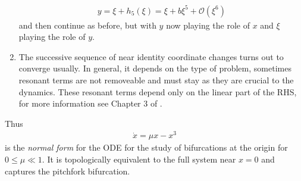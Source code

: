 \begin{ex}
\begin{enumerate}
	\begin{align}
		y = \xi + h_5(\xi) = \xi + b \xi^5 + \mathcal{O}(\xi^6)
	\end{align}
	and then continue as before, but with $y$ now playing the role of $x$ and $\xi$ playing the role of $y$.
\item The successive sequence of near identity coordinate changes turns out to converge usually. In general, it depends on the type of problem, sometimes resonant terms are not removeable and must stay as they are crucial to the dynamics. These resonant terms depend only on the linear part of the RHS, for more information see Chapter 3 of \cite{GuckenheimerHolmes}.
	\end{enumerate}
Thus 
\begin{align}
	\boxed{
\dot{x} = \mu x - x^3	
}
\end{align}
is the \emph{normal form} for the ODE for the study of bifurcations at the origin for $0 \leq \mu \ll 1$. It is topologically equivalent to the full system near $x=0$ and captures the pitchfork bifurcation.
\end{ex}


